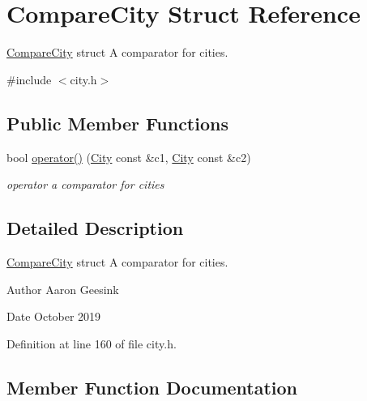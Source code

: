 \hypertarget{struct_compare_city}{}\section{Compare\+City Struct Reference}
\label{struct_compare_city}


\mbox{\hyperlink{struct_compare_city}{Compare\+City}} struct A comparator for cities.  




{\ttfamily \#include $<$city.\+h$>$}

\subsection*{Public Member Functions}
\begin{DoxyCompactItemize}
\item 
bool \mbox{\hyperlink{struct_compare_city_a08fbbcc6710ad653fdee21de31576d10}{operator()}} (\mbox{\hyperlink{class_city}{City}} const \&c1, \mbox{\hyperlink{class_city}{City}} const \&c2)
\begin{DoxyCompactList}\small\item\em operator a comparator for cities \end{DoxyCompactList}\end{DoxyCompactItemize}


\subsection{Detailed Description}
\mbox{\hyperlink{struct_compare_city}{Compare\+City}} struct A comparator for cities. 

\begin{DoxyAuthor}{Author}
Aaron Geesink 
\end{DoxyAuthor}
\begin{DoxyDate}{Date}
October 2019 
\end{DoxyDate}


Definition at line 160 of file city.\+h.



\subsection{Member Function Documentation}
\mbox{\label{struct_compare_city_a08fbbcc6710ad653fdee21de31576d10}} 
